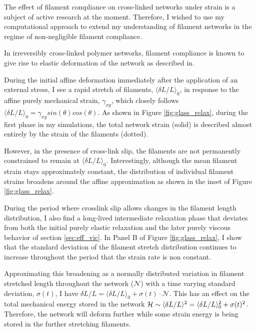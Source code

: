 The effect of filament compliance on cross-linked networks under strain is a subject of active research at the moment.  Therefore, I wished to use my computational approach to extend my understanding of filament networks in the regime of non-negligible filament compliance.  

In irreversibly cross-linked polymer networks, filament compliance is known to give rise to elastic deformation of the network as described in\cite{theo_hlm,theo_hlm2}.    

During the initial affine deformation immediately after the application of an external stress, I see a rapid stretch of filaments, $\langle \delta L/L\rangle_0$, in response to the affine purely mechanical strain, $\gamma_{xy}$, which closely follows $\langle \delta L/L\rangle_0 = \gamma_{xy}sin(\theta)cos(\theta)$. As shown in Figure \ref{fig:glass_relax}, during the first phase in my simulations, the total network strain (solid) is described almost entirely by the strain of the filaments (dotted).  

However, in the presence of cross-link slip, the filaments are not permanently constrained to remain at $\langle \delta L/L\rangle_0$.  Interestingly, although the mean filament strain stays approximately constant, the distribution of individual filament strains broadens around the affine approximation as shown in the inset of Figure \ref{fig:glass_relax}.  

During the period where crosslink slip allows changes in the filament length distribution, I also find a long-lived intermediate relaxation phase that deviates from both the initial purely elastic relaxation and the later purely viscous behavior of section \ref{sec:eff_vic}.  In Panel B of Figure \ref{fig:glass_relax}, I show that the standard deviation of the filament stretch distribution continues to increase throughout the period that the strain rate is non constant.   

Approximating this broadening as a normally distributed variation in filament stretched length throughout the network ($\mathcal{N}$) with a time varying standard deviation, $\sigma(t)$, I have $\delta L/L = \langle \delta L/L\rangle_0 + \sigma(t)\cdot\mathcal{N}$. 
 This has an effect on the total mechanical energy stored in the network ${\cal H} \sim  \langle\delta L/L\rangle^2 = \langle\delta L/L\rangle_0^2 +\sigma(t)^2 $.   Therefore, the network will deform further while some strain energy is being stored in the further stretching filaments.  



